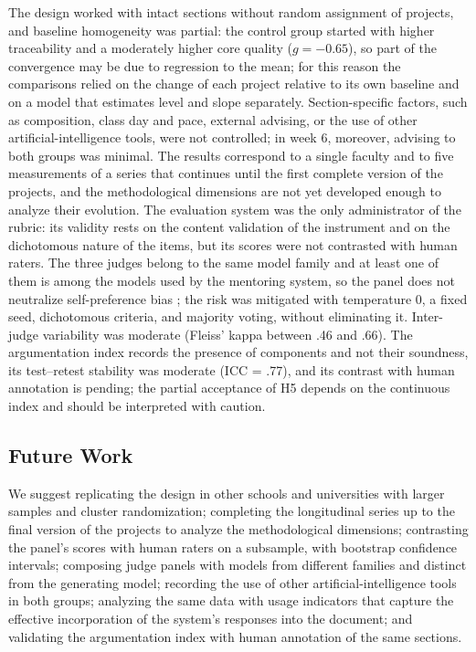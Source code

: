 \documentclass[journal]{IEEEtran}
\begin{document}
The design worked with intact sections without random assignment of projects, and baseline homogeneity was partial: the control group started with higher traceability and a moderately higher core quality ($g = -0.65$), so part of the convergence may be due to regression to the mean; for this reason the comparisons relied on the change of each project relative to its own baseline and on a model that estimates level and slope separately. Section-specific factors, such as composition, class day and pace, external advising, or the use of other artificial-intelligence tools, were not controlled; in week 6, moreover, advising to both groups was minimal. The results correspond to a single faculty and to five measurements of a series that continues until the first complete version of the projects, and the methodological dimensions are not yet developed enough to analyze their evolution. The evaluation system was the only administrator of the rubric: its validity rests on the content validation of the instrument and on the dichotomous nature of the items, but its scores were not contrasted with human raters. The three judges belong to the same model family and at least one of them is among the models used by the mentoring system, so the panel does not neutralize self-preference bias \cite{panickssery2024}; the risk was mitigated with temperature 0, a fixed seed, dichotomous criteria, and majority voting, without eliminating it. Inter-judge variability was moderate (Fleiss' kappa between .46 and .66). The argumentation index records the presence of components and not their soundness, its test--retest stability was moderate (ICC = .77), and its contrast with human annotation is pending; the partial acceptance of H5 depends on the continuous index and should be interpreted with caution.

\subsection{Future Work}

We suggest replicating the design in other schools and universities with larger samples and cluster randomization; completing the longitudinal series up to the final version of the projects to analyze the methodological dimensions; contrasting the panel's scores with human raters on a subsample, with bootstrap confidence intervals; composing judge panels with models from different families and distinct from the generating model; recording the use of other artificial-intelligence tools in both groups; analyzing the same data with usage indicators that capture the effective incorporation of the system's responses into the document; and validating the argumentation index with human annotation of the same sections.
\end{document}
